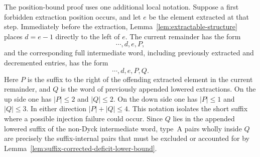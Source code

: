 \documentclass[11pt]{article}
\theoremstyle{plain}
\theoremstyle{definition}
\theoremstyle{remark}
\begin{document}
The position-bound proof uses one additional local notation.  Suppose a first
forbidden extraction position occurs, and let \(e\) be the element extracted at
that step.  Immediately before the extraction, Lemma~\ref{lem:extractable-structure}
places \(d=e-1\) directly to the left of \(e\).  The current remainder has the
form
\[
  \cdots,d,e,P,
\]
and the corresponding full intermediate word, including previously extracted
and decremented entries, has the form
\[
  \cdots,d,e,P,Q.
\]
Here \(P\) is the suffix to the right of the offending extracted element in the
current remainder, and \(Q\) is the word of previously appended lowered
extractions.  On the \(\mathrm{up}\) side one has \(|P|\le 2\) and
\(|Q|\le 2\).  On the \(\mathrm{down}\) side one has \(|P|\le 1\) and
\(|Q|\le 3\).  In either direction \(|P|+|Q|\le 4\).  This notation isolates
the short suffix where a possible injection failure could occur.  Since \(Q\)
lies in the appended lowered suffix of the non-Dyck intermediate word, type~A
pairs wholly inside \(Q\) are precisely the suffix-internal pairs that must be
excluded or accounted for by
Lemma~\ref{lem:suffix-corrected-deficit-lower-bound}.
\end{document}
